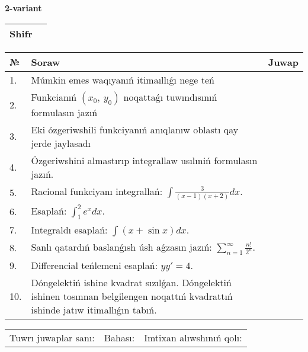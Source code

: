 \documentclass{article}
\begin{document}
  \egroup
  
  \newpage
  
  
  \textbf{2-variant}\\
  
  \bgroup
  \def\arraystretch{1.6} %
  
  \begin{tabular}{|m{5.7cm}|m{9.5cm}|}
  \hline
  Shifr & \\
  \hline
  \end{tabular}
  
  \vspace{1cm}
  
  \begin{tabular}{|m{0.7cm}|m{10cm}|m{4cm}|}
  \hline
  № & Soraw & Juwap \\
  \hline
  1. & Múmkin emes waqıyanıń itimaıllıǵı nege teń &  \\
  \hline
  2. & Funkcianıń \((x_{0},\ y_{0})\) noqattaǵı tuwındısınıń formulasın jazıń &  \\
  \hline
  3. & Eki ózgeriwshili funkciyanıń anıqlanıw oblastı qay jerde jaylasadı &  \\
  \hline
  4. & Ózgeriwshini almastırıp integrallaw usılıniń formulasın jazıń. &  \\
  \hline
  5. & Racional funkciyanı integrallań: \(\int{\frac{3}{(x - 1)(x + 2)}dx}\). &  \\
  \hline
  6. & Esaplań: \(\int_{1}^2 {e^{x}dx}\). &  \\
  \hline
  7. & Integraldı esaplań: \(\int{(x + \sin x)dx}\). &  \\
  \hline
  8. & Sanlı qatardıń baslanǵısh úsh aǵzasın jazıń: \(\sum_{n = 1}^{\infty}\frac{n!}{2^{n}}\). &  \\
  \hline
  9. & Differencial teńlemeni esaplań: \(yy' = 4\). &  \\
  \hline
  10. & Dóngelektiń ishine kvadrat sızılǵan. Dóngelektiń ishinen tosınnan belgilengen noqattıń kvadrattıń ishinde jatıw itimallıǵın tabıń. &  \\
  \hline
  \end{tabular}
  
  \vspace{1cm}
  
  \begin{tabular}{lll}
  Tuwrı juwaplar sanı: \underline{\hspace{1.5cm}} & 
  Bahası: \underline{\hspace{1.5cm}} & 
  Imtixan alıwshınıń qolı: \underline{\hspace{2cm}} \\
  \end{tabular}
  
\end{document}
